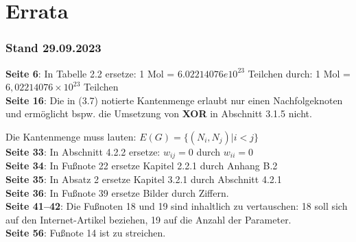 \chapter*{Errata}

\subsection*{Stand 29.09.2023}

\textbf{Seite 6}: In Tabelle 2.2 ersetze: 1 Mol = $6.02214076e10^{23}$ Teilchen durch: 1 Mol = $6,02214076\times10^{23}$ Teilchen\\

\noindent
\textbf{Seite 16}:
Die in (3.7) notierte Kantenmenge erlaubt nur einen Nachfolgeknoten und ermöglicht {bspw.} die Umsetzung von \textbf{XOR} in Abschnitt 3.1.5 nicht.

Die Kantenmenge muss lauten: $E(G) = \{(N_i, N_j) | i < j\}$\\

\noindent
\textbf{Seite 33}:
In Abschnitt 4.2.2 ersetze: $w_{ij} = 0$ durch $w_{ii} = 0$\\

\noindent
\textbf{Seite 34}:
In Fußnote 22 ersetze Kapitel 2.2.1 durch Anhang B.2\\

\noindent
\textbf{Seite 35}:
In Absatz 2 ersetze Kapitel 3.2.1 durch Abschnitt 4.2.1\\

\noindent
\textbf{Seite 36}:
In Fußnote 39 ersetze Bilder durch Ziffern.\\

\noindent
\textbf{Seite 41--42}:
Die Fußnoten 18 und 19 sind inhaltlich zu vertauschen: 18 soll sich auf den Internet-Artikel beziehen, 19 auf die Anzahl der Parameter.\\

\noindent
\textbf{Seite 56}:
Fußnote 14 ist zu streichen.\\